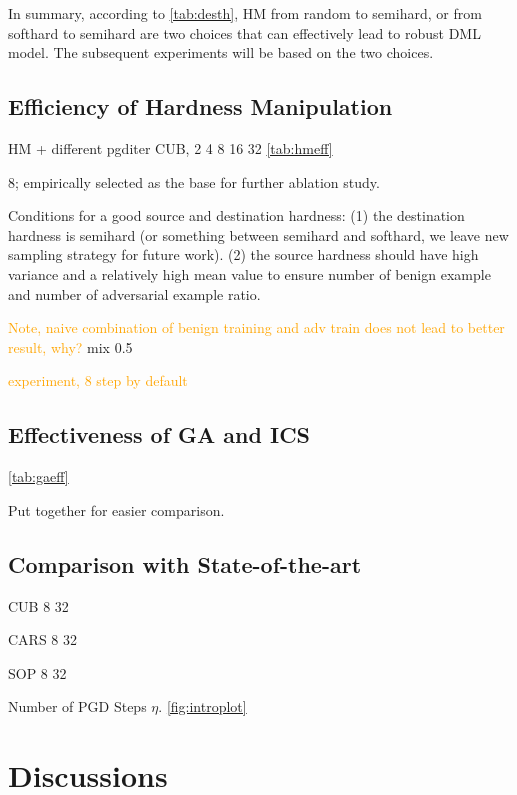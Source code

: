 \documentclass[10pt,twocolumn,letterpaper]{article}
\newcommand{\oo}[1]{\textcolor{orange}{#1}}
\begin{document}

In summary, according to \cref{tab:desth}, HM from random to semihard, or from
softhard to semihard are two choices that can effectively lead to robust
DML model.
%
The subsequent experiments will be based on the two choices.

\subsection{Efficiency of Hardness Manipulation}
\label{sec:42}

HM + different pgditer
CUB, 2 4 8 16 32
\cref{tab:hmeff}

8; empirically selected as the base for further ablation study.

Conditions for a good source and destination hardness:
%
(1) the destination hardness is semihard (or something between semihard
and softhard, we leave new sampling strategy for future work).
(2) the source hardness should have high variance and a relatively high mean
value to ensure number of benign example and number of adversarial example ratio.

\oo{Note, naive combination of benign training and adv train does not lead to better
result, why?} mix 0.5

\oo{experiment, 8 step by default}

\subsection{Effectiveness of GA and ICS}
\label{sec:43}



\cref{tab:gaeff}



Put together for easier comparison.

\subsection{Comparison with State-of-the-art}



CUB 8 32

CARS 8 32

SOP 8 32

Number of PGD Steps $\eta$.
\cref{fig:introplot}

\section{Discussions}
\label{sec:5}
\end{document}
